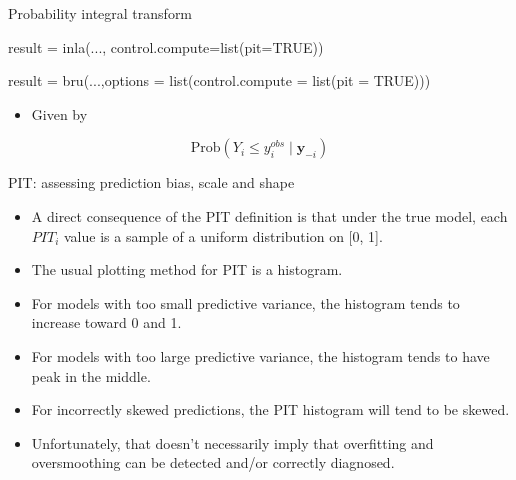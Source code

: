 \documentclass[
  ignorenonframetext,
  handout]{beamer}
\newenvironment{Shaded}{\begin{snugshade}}{\end{snugshade}}
\newcommand{\AttributeTok}[1]{\textcolor[rgb]{0.77,0.63,0.00}{#1}}
\newcommand{\ConstantTok}[1]{\textcolor[rgb]{0.00,0.00,0.00}{#1}}
\newcommand{\FunctionTok}[1]{\textcolor[rgb]{0.00,0.00,0.00}{#1}}
\newcommand{\NormalTok}[1]{#1}
\newcommand{\OtherTok}[1]{\textcolor[rgb]{0.56,0.35,0.01}{#1}}
\providecommand{\tightlist}{%
  \setlength{\itemsep}{0pt}\setlength{\parskip}{0pt}}
\begin{document}
\begin{frame}[fragile]{Probability integral transform}
\protect\hypertarget{probability-integral-transform}{}
\small

\begin{Shaded}
\begin{Highlighting}[]
\NormalTok{result }\OtherTok{=} \FunctionTok{inla}\NormalTok{(...,}
              \AttributeTok{control.compute=}\FunctionTok{list}\NormalTok{(}\AttributeTok{pit=}\ConstantTok{TRUE}\NormalTok{))}

\NormalTok{result }\OtherTok{=} \FunctionTok{bru}\NormalTok{(...,}\AttributeTok{options =} \FunctionTok{list}\NormalTok{(}\AttributeTok{control.compute =} 
                                  \FunctionTok{list}\NormalTok{(}\AttributeTok{pit =} \ConstantTok{TRUE}\NormalTok{)))}
\end{Highlighting}
\end{Shaded}

\normalsize

\begin{itemize}
\tightlist
\item
  Given by
\end{itemize}

\[
\text{Prob}(Y_i \leq y_i^{obs} \mid \boldsymbol{y}_{-i})
\]
\end{frame}

\begin{frame}{PIT: assessing prediction bias, scale and shape}
\protect\hypertarget{pit-assessing-prediction-bias-scale-and-shape}{}
\begin{itemize}
\item
  A direct consequence of the PIT definition is that under the true
  model, each \(PIT_i\) value is a sample of a uniform distribution on
  {[}0, 1{]}.
\item
  The usual plotting method for PIT is a histogram.
\item
  For models with too small predictive variance, the histogram tends to
  increase toward 0 and 1.
\item
  For models with too large predictive variance, the histogram tends to
  have peak in the middle.
\item
  For incorrectly skewed predictions, the PIT histogram will tend to be
  skewed.
\item
  Unfortunately, that doesn't necessarily imply that overfitting and
  oversmoothing can be detected and/or correctly diagnosed.
\end{itemize}
\end{frame}
\end{document}
